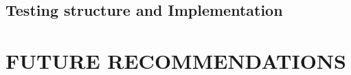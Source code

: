 \documentclass[10pt,twocolumn]{witseiepaper}
\begin{document}









\subsection{Testing structure and Implementation}




\section{FUTURE RECOMMENDATIONS}
\end{document}
